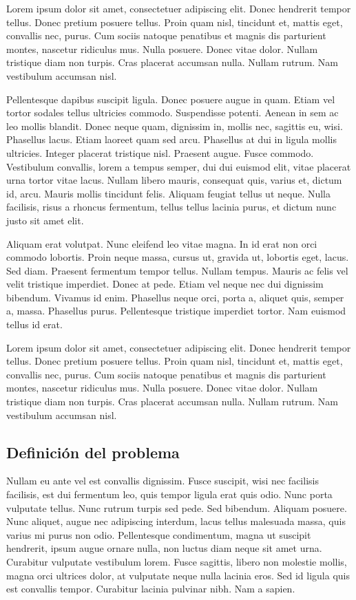 Lorem ipsum dolor sit amet, consectetuer adipiscing elit.  Donec
hendrerit tempor tellus.  Donec pretium posuere tellus.  Proin quam
nisl, tincidunt et, mattis eget, convallis nec, purus.  Cum sociis
natoque penatibus et magnis dis parturient montes, nascetur ridiculus
mus.  Nulla posuere.  Donec vitae dolor.  Nullam tristique diam non
turpis.  Cras placerat accumsan nulla.  Nullam rutrum.  Nam vestibulum
accumsan nisl.


Pellentesque dapibus suscipit ligula.  Donec posuere augue in quam.
Etiam vel tortor sodales tellus ultricies commodo.  Suspendisse
potenti.  Aenean in sem ac leo mollis blandit.  Donec neque quam,
dignissim in, mollis nec, sagittis eu, wisi.  Phasellus lacus.  Etiam
laoreet quam sed arcu.  Phasellus at dui in ligula mollis ultricies.
Integer placerat tristique nisl.  Praesent augue.  Fusce commodo.
Vestibulum convallis, lorem a tempus semper, dui dui euismod elit,
vitae placerat urna tortor vitae lacus.  Nullam libero mauris,
consequat quis, varius et, dictum id, arcu.  Mauris mollis tincidunt
felis.  Aliquam feugiat tellus ut neque.  Nulla facilisis, risus a
rhoncus fermentum, tellus tellus lacinia purus, et dictum nunc justo
sit amet elit.

Aliquam erat volutpat.  Nunc eleifend leo vitae magna.  In id erat non
orci commodo lobortis.  Proin neque massa, cursus ut, gravida ut,
lobortis eget, lacus.  Sed diam.  Praesent fermentum tempor tellus.
Nullam tempus.  Mauris ac felis vel velit tristique imperdiet.  Donec
at pede.  Etiam vel neque nec dui dignissim bibendum.  Vivamus id
enim.  Phasellus neque orci, porta a, aliquet quis, semper a, massa.
Phasellus purus.  Pellentesque tristique imperdiet tortor.  Nam
euismod tellus id erat.

Lorem ipsum dolor sit amet, consectetuer adipiscing elit.  Donec
hendrerit tempor tellus.  Donec pretium posuere tellus.  Proin quam
nisl, tincidunt et, mattis eget, convallis nec, purus.  Cum sociis
natoque penatibus et magnis dis parturient montes, nascetur ridiculus
mus.  Nulla posuere.  Donec vitae dolor.  Nullam tristique diam non
turpis.  Cras placerat accumsan nulla.  Nullam rutrum.  Nam vestibulum
accumsan nisl.

\subsection{Definición del problema}

Nullam eu ante vel est convallis dignissim.  Fusce suscipit, wisi nec
facilisis facilisis, est dui fermentum leo, quis tempor ligula erat
quis odio.  Nunc porta vulputate tellus.  Nunc rutrum turpis sed pede.
Sed bibendum.  Aliquam posuere.  Nunc aliquet, augue nec adipiscing
interdum, lacus tellus malesuada massa, quis varius mi purus non odio.
Pellentesque condimentum, magna ut suscipit hendrerit, ipsum augue
ornare nulla, non luctus diam neque sit amet urna.  Curabitur
vulputate vestibulum lorem.  Fusce sagittis, libero non molestie
mollis, magna orci ultrices dolor, at vulputate neque nulla lacinia
eros.  Sed id ligula quis est convallis tempor.  Curabitur lacinia
pulvinar nibh.  Nam a sapien.

